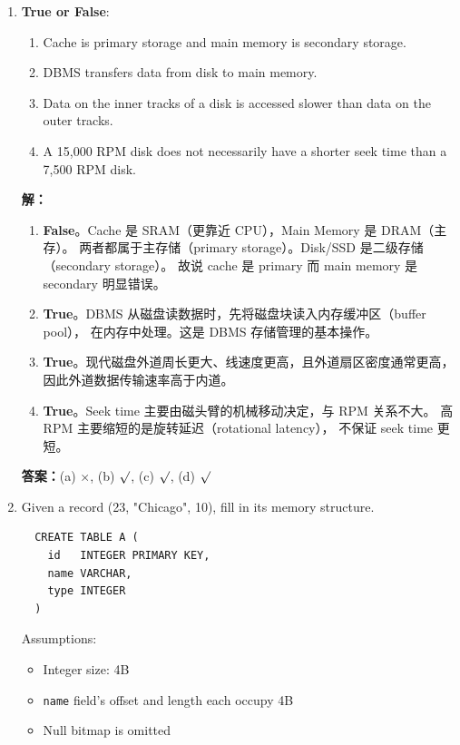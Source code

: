 \documentclass[11pt,a4paper]{article}
\newcommand{\solution}{\par\noindent\textcolor{ansblue}{\textbf{解：}}}
\newcommand{\answer}{\par\noindent\textcolor{ansred}{\textbf{答案：}}}
\begin{document}
\begin{enumerate}[leftmargin=*,itemsep=6pt]

\item \textbf{True or False}:

  \begin{enumerate}[label=(\alph*)]
    \item Cache is primary storage and main memory is secondary storage.
    \item DBMS transfers data from disk to main memory.
    \item Data on the inner tracks of a disk is accessed slower than data on
          the outer tracks.
    \item A 15,000 RPM disk does not necessarily have a shorter seek time than
          a 7,500 RPM disk.
  \end{enumerate}

  \solution
  \begin{enumerate}[label=(\alph*)]
    \item \textbf{False}。Cache 是 SRAM（更靠近 CPU），Main Memory 是 DRAM（主存）。
          两者都属于主存储（primary storage）。Disk/SSD 是二级存储（secondary storage）。
          故说 cache 是 primary 而 main memory 是 secondary 明显错误。
    \item \textbf{True}。DBMS 从磁盘读数据时，先将磁盘块读入内存缓冲区（buffer pool），
          在内存中处理。这是 DBMS 存储管理的基本操作。
    \item \textbf{True}。现代磁盘外道周长更大、线速度更高，且外道扇区密度通常更高，
          因此外道数据传输速率高于内道。
    \item \textbf{True}。Seek time 主要由磁头臂的机械移动决定，与 RPM 关系不大。
          高 RPM 主要缩短的是旋转延迟（rotational latency），
          不保证 seek time 更短。
  \end{enumerate}

  \answer (a) \textcolor{ansred}{$\times$}, (b) \textcolor{ansred}{$\surd$},
  (c) \textcolor{ansred}{$\surd$}, (d) \textcolor{ansred}{$\surd$}

\item Given a record (23, "Chicago", 10), fill in its memory structure.

  {\small
  \begin{verbatim}
  CREATE TABLE A (
    id   INTEGER PRIMARY KEY,
    name VARCHAR,
    type INTEGER
  )
  \end{verbatim}}

  Assumptions:
  \begin{itemize}[nosep]
    \item Integer size: 4B
    \item \texttt{name} field's offset and length each occupy 4B
    \item Null bitmap is omitted
  \end{itemize}


\end{enumerate}
\end{document}
